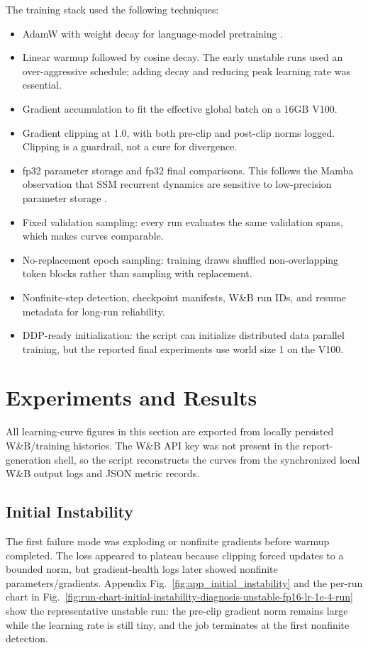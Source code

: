 \documentclass[conference]{IEEEtran}
\begin{document}
The training stack used the following techniques:
\begin{itemize}
    \item AdamW with weight decay for language-model pretraining \cite{adamw}.
    \item Linear warmup followed by cosine decay. The early unstable runs used an over-aggressive schedule; adding decay and reducing peak learning rate was essential.
    \item Gradient accumulation to fit the effective global batch on a 16GB V100.
    \item Gradient clipping at 1.0, with both pre-clip and post-clip norms logged. Clipping is a guardrail, not a cure for divergence.
    \item fp32 parameter storage and fp32 final comparisons. This follows the Mamba observation that SSM recurrent dynamics are sensitive to low-precision parameter storage \cite{mamba}.
    \item Fixed validation sampling: every run evaluates the same validation spans, which makes curves comparable.
    \item No-replacement epoch sampling: training draws shuffled non-overlapping token blocks rather than sampling with replacement.
    \item Nonfinite-step detection, checkpoint manifests, W\&B run IDs, and resume metadata for long-run reliability.
    \item DDP-ready initialization: the script can initialize distributed data parallel training, but the reported final experiments use world size 1 on the V100.
\end{itemize}

\section{Experiments and Results}

All learning-curve figures in this section are exported from locally persisted W\&B/training histories. The W\&B API key was not present in the report-generation shell, so the script reconstructs the curves from the synchronized local W\&B output logs and JSON metric records.

\subsection{Initial Instability}

The first failure mode was exploding or nonfinite gradients before warmup completed. The loss appeared to plateau because clipping forced updates to a bounded norm, but gradient-health logs later showed nonfinite parameters/gradients. Appendix Fig.~\ref{fig:app_initial_instability} and the per-run chart in Fig.~\ref{fig:run-chart-initial-instability-diagnosis-unstable-fp16-lr-1e-4-run} show the representative unstable run: the pre-clip gradient norm remains large while the learning rate is still tiny, and the job terminates at the first nonfinite detection.
\end{document}
